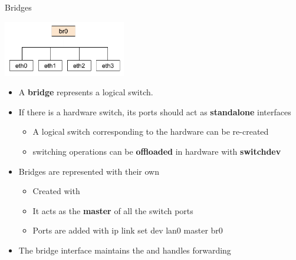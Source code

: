 \begin{frame}{Bridges}
	\begin{center}
	\includegraphics[width=0.4\textwidth]{slides/networking-stack-netdevice/bridge.pdf}
	\end{center}
	\begin{itemize}
		\item A \textbf{bridge} represents a logical switch.
		\item If there is a hardware switch, its ports should act as \textbf{standalone} interfaces
			\begin{itemize}
				\item A logical switch corresponding to the hardware can be re-created
				\item switching operations can be \textbf{offloaded} in hardware with \textbf{switchdev}
			\end{itemize}
		\item Bridges are represented with their own 
			\begin{itemize}
				\item Created with 
				\item It acts as the \textbf{master} of all the switch ports
				\item Ports are added with {ip link set dev lan0 master br0}
			\end{itemize}
		\item The bridge interface maintains the  and handles forwarding
	\end{itemize}
\end{frame}

